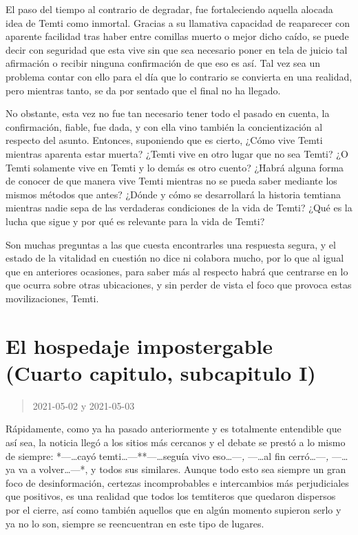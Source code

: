 \documentclass[
  spanish,
]{book}
\begin{document}
El paso del tiempo al contrario de degradar, fue fortaleciendo aquella alocada idea de Temti como inmortal. Gracias a su llamativa capacidad de reaparecer con aparente facilidad tras haber entre comillas muerto o mejor dicho caído, se puede decir con seguridad que esta vive sin que sea necesario poner en tela de juicio tal afirmación o recibir ninguna confirmación de que eso es así. Tal vez sea un problema contar con ello para el día que lo contrario se convierta en una realidad, pero mientras tanto, se da por sentado que el final no ha llegado.

No obstante, esta vez no fue tan necesario tener todo el pasado en cuenta, la confirmación, fiable, fue dada, y con ella vino también la concientización al respecto del asunto. Entonces, suponiendo que es cierto, ¿Cómo vive Temti mientras aparenta estar muerta? ¿Temti vive en otro lugar que no sea Temti? ¿O Temti solamente vive en Temti y lo demás es otro cuento? ¿Habrá alguna forma de conocer de que manera vive Temti mientras no se pueda saber mediante los mismos métodos que antes? ¿Dónde y cómo se desarrollará la historia temtiana mientras nadie sepa de las verdaderas condiciones de la vida de Temti? ¿Qué es la lucha que sigue y por qué es relevante para la vida de Temti?

Son muchas preguntas a las que cuesta encontrarles una respuesta segura, y el estado de la vitalidad en cuestión no dice ni colabora mucho, por lo que al igual que en anteriores ocasiones, para saber más al respecto habrá que centrarse en lo que ocurra sobre otras ubicaciones, y sin perder de vista el foco que provoca estas movilizaciones, Temti.

\hypertarget{el-hospedaje-impostergable-cuarto-capitulo-subcapitulo-i}{%
\section{El hospedaje impostergable (Cuarto capitulo, subcapitulo I)}\label{el-hospedaje-impostergable-cuarto-capitulo-subcapitulo-i}}

\begin{quote}
2021-05-02 y 2021-05-03
\end{quote}

Rápidamente, como ya ha pasado anteriormente y es totalmente entendible que así sea, la noticia llegó a los sitios más cercanos y el debate se prestó a lo mismo de siempre: *---\ldots cayó temti\ldots---**---\ldots seguía vivo eso\ldots---\emph{, }---\ldots al fin cerró\ldots---\emph{, }---\ldots ya va a volver\ldots---*, y todos sus similares. Aunque todo esto sea siempre un gran foco de desinformación, certezas incomprobables e intercambios más perjudiciales que positivos, es una realidad que todos los temtiteros que quedaron dispersos por el cierre, así como también aquellos que en algún momento supieron serlo y ya no lo son, siempre se reencuentran en este tipo de lugares.
\end{document}
